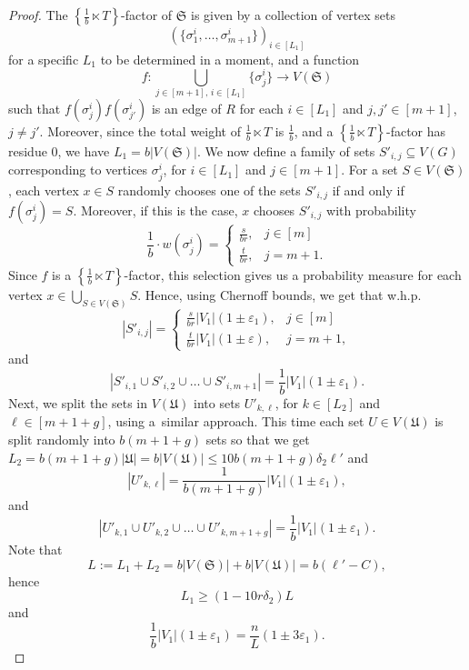 \documentclass[reqno, 12pt]{amsart}
\numberwithin{equation}{section}
\numberwithin{figure}{section}
\theoremstyle{plain}
\theoremstyle{definition}
\let\eps=\varepsilon
\def\fS{\mathfrak{S}}
\def\fU{\mathfrak{U}}
\let\lra=\longrightarrow
\let\to=\lra
\begin{document}
\begin{proof}
          The $\left\{\frac 1b\ltimes T\right\}$-factor of $\fS$ is given by a collection of vertex sets
          \[ \left(\{\sigma_1^i,\dots,\sigma_{m+1}^i\}\right)_{i\in[L_1]}\] 
          for a specific $L_1$ to be determined in a moment, and a function
          \[ f: \bigcup_{j\in[m+1],\,i\in[L_1]} \{\sigma_{j}^{i}\} \to V({\fS})\]
          such that $f(\sigma_j^i)f(\sigma_{j'}^i)$ is an edge of $R$ for each $i\in[L_1]$ and $j,j'\in[m+1]$, $j\neq j'$. 
          Moreover, since the total weight of $\frac 1b\ltimes T$ is $\frac 1b$, and a $\left\{\frac 1b\ltimes T\right\}$-factor has residue $0$, we have $L_1 = b|V(\fS)|$. We now define a family of sets $S'_{i,j}\subseteq V(G)$ corresponding to vertices $\sigma^i_j$, for $i\in[L_1]$ and $j\in[m+1]$. For a set $S\in V(\fS)$, each vertex $x\in S$ randomly chooses one of the sets $S'_{i,j}$ if and only if $f(\sigma^i_j)= S$. Moreover, if this is the case, $x$ chooses $S'_{i,j}$ with probability 
          \[\frac 1b\cdot w(\sigma^i_j) = \begin{cases}
              \frac{s}{br}, & j\in[m] \\
              \frac{t}{br}, & j = m+1.
          \end{cases}\]
        Since $f$ is a $\left\{\frac 1b\ltimes T\right\}$-factor, this selection gives us a probability measure for each vertex $x \in \bigcup_{S\in V(\fS)} S$. Hence, using Chernoff bounds, we get that w.h.p.
        \[ |S'_{i,j}| = \begin{cases}
              \frac{s}{br}|V_1|(1\pm\eps_1), & j\in[m] \\
              \frac{t}{br}|V_1|(1\pm\eps), & j = m+1,
          \end{cases}\]
          and
          \[ |S'_{i,1}\cup S'_{i,2} \cup \dots \cup S'_{i,m+1}| = \frac 1b|V_1|(1\pm\eps_1).\]
         Next, we split the sets in $V(\fU)$ into sets $U'_{k,\ell}$, for $k\in[L_2]$ and $\ell\in[m+1+g]$, using a~similar approach. This time each set $U\in V(\fU)$ is split randomly into $b(m+1+g)$ sets so that we get $L_2 = b(m+1+g)|\fU| = b|V(\fU)|\leq 10b(m+1+g)\delta_2\ell'$ and
         \[ |U'_{k,\ell}| = \frac{1}{b(m+1+g)}|V_1|(1\pm\eps_1),\]
         and
         \[ |U'_{k,1}\cup U'_{k,2} \cup \dots \cup U'_{k,m+1+g}| = \frac 1b|V_1|(1\pm\eps_1).\]
         Note that 
         \[ L := L_1+L_2 = b|V(\fS)| + b|V(\fU)| = b(\ell' - C),\]
         hence
         \[ L_1 \geq \left(1-10r\delta_2\right)L\]
         and
         \[ \frac 1b|V_1|(1\pm\eps_1) = \frac{n}{L}(1\pm 3\eps_1).\]
         

\end{proof}
\end{document}
